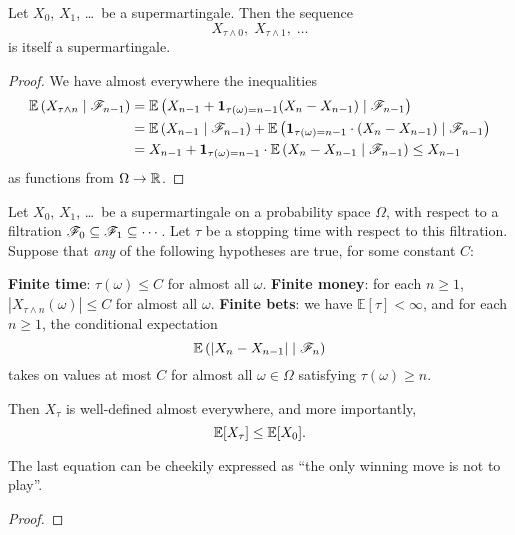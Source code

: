 \begin{proposition}
	Let $X_0$, $X_1$, \dots\ be a supermartingale.
	Then the sequence
	\[ X_{\tau \wedge 0}, \; X_{\tau \wedge 1}, \; \dots \]
	is itself a supermartingale.
\end{proposition}
\begin{proof}
	We have almost everywhere the inequalities
	\begin{align*}
		\mathbb E\left( X_{\tau \wedge n} \mid \mathscr F_{n-1} \right)
		&= \mathbb E \left( X_{n-1} + \mathbf 1_{\tau(\omega) = n-1} (X_n - X_{n-1}) \mid \mathscr F_{n-1} \right) \\
		&= \mathbb E \left( X_{n-1} \mid \mathscr F_{n-1} \right)
		+ \mathbb E \left( \mathbf 1_{\tau(\omega) = n-1} \cdot (X_n - X_{n-1}) \mid \mathscr F_{n-1} \right) \\
		&= X_{n-1} + \mathbf 1_{\tau(\omega) = n-1}
			\cdot\mathbb E \left(  X_n - X_{n-1} \mid \mathscr F_{n-1} \right)
		\le X_{n-1}
	\end{align*}
	as functions from $\Omega \to \mathbb R$.
\end{proof}

\begin{theorem}
	Let $X_0$, $X_1$, \dots\ be a supermartingale on a probability space $\Omega$,
	with respect to a filtration $\mathscr F_0 \subseteq \mathscr F_1 \subseteq \cdots$.
	Let $\tau$ be a stopping time with respect to this filtration.
	Suppose that \emph{any} of the following hypotheses are true,
	for some constant $C$:
	\begin{enumerate}[(a)]
		\ii \textbf{Finite time}: $\tau(\omega) \le C$ for almost all $\omega$.
		\ii \textbf{Finite money}: for each $n \ge 1$,
		$\left\lvert X_{\tau \wedge n}(\omega) \right\rvert \le C$
		for almost all $\omega$.
		\ii \textbf{Finite bets}: we have $\mathbb E[\tau] < \infty$,
		and for each $n \ge 1$, the conditional expectation
		\[ \mathbb E\left( \left\lvert X_n-X_{n-1} \right\rvert
			\mid \mathscr F_n \right) \]
		takes on values at most $C$ for almost all $\omega \in \Omega$
		satisfying $\tau(\omega) \ge n$.
	\end{enumerate}
	Then $X_\tau$ is well-defined almost everywhere,
	and more importantly, \[ \mathbb E[X_\tau] \le \mathbb E[X_0]. \]
\end{theorem}
The last equation can be cheekily expressed as
``the only winning move is not to play''.

\begin{proof}
\end{proof}


